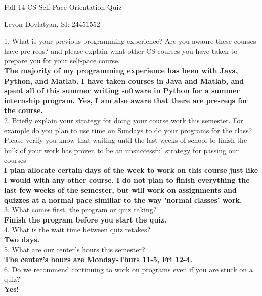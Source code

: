 \documentclass{article}
\begin{document}
\huge Fall 14 CS Self-Pace Orientation Quiz
\begin{center}
\large Levon Dovlatyan, SI: 24451552
\end{center}


\normalsize 1. What is your previous programming experience? Are you awaure these courses have pre-reqs? and please explain what other CS courses you have taken to prepare you for your self-pace course. \\

\textbf{The majority of my programming experience has been with Java, Python, and Matlab. I have taken courses in Java and Matlab, and spent all of this summer writing software in Python for a summer internship program. Yes, I am also aware that there are pre-reqs for the course.} \\

\normalsize 2. Briefly explain your strategy for doing your course work this semester. For
example do you plan to use time on Sundays to do your programs for the
class? Please verify you know that waiting until the last weeks of school to
finish the bulk of your work has proven to be an unsuccessful strategy for
passing our courses \\

\textbf{I plan allocate certain days of the week to work on this course just like I would with any other course. I do not plan to finish everything the last few weeks of the semester, but will work on assignments and quizzes at a normal pace similiar to the way 'normal classes' work.} \\

\normalsize 3. What comes first, the program or quiz taking? \\

\textbf{Finish the program before you start the quiz.} \\

\normalsize 4. What is the wait time between quiz retakes? \\

\textbf{Two days.} \\

\normalsize 5. What are our center's hours this semester? \\

\textbf{The center's hours are Monday-Thurs 11-5, Fri 12-4.} \\

\normalsize 6. Do we recommend continuing to work on programs even if you are stuck on a quiz? \\

\textbf{Yes!}
\end{document}
